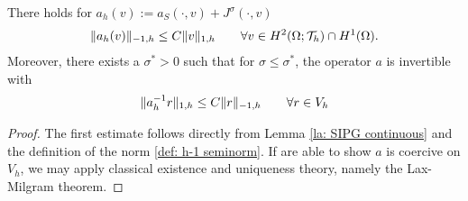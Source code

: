 \begin{theorem}[Stability]\label{thm: SIPG stability}
There holds for $a_h(v):=a_S(\cdot, v)+J^\sigma(\cdot, v)$
	\begin{align*}
	 	\HMinusOneDnorm{a_h (v)} \leq C \HOneDnorm v \qquad \forall v \in H^2(\Omega; \triang) \cap H^1(\Omega). %
	 \end{align*}
	 Moreover, there exists a $\sigma^* > 0$ such that for $\sigma \leq \sigma^* $, the operator $a$ is invertible with 
	 \begin{align*}
	 	\HOneDnorm {a_h^{-1} r} \leq C \HMinusOneDnorm r \qquad \forall r \in V_h %
	 \end{align*}
\end{theorem}
\begin{proof}
	The first estimate follows directly from Lemma \ref{la: SIPG continuous} and the definition of the norm \ref{def: h-1 seminorm}. If are able to show $a$ is coercive on $V_h$, we may apply classical existence and uniqueness theory, namely the Lax-Milgram theorem.
	

\end{proof}
